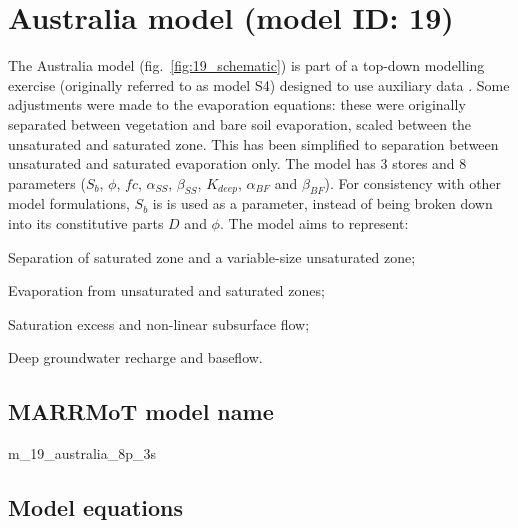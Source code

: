 \section{Australia model (model ID: 19)}
The Australia model (fig.~\ref{fig:19_schematic}) is part of a top-down modelling exercise (originally referred to as model S4) designed to use auxiliary data \citep{Farmer2003}. 
Some adjustments were made to the evaporation equations: these were originally separated between vegetation and bare soil evaporation, scaled between the unsaturated and saturated zone. 
This has been simplified to separation between unsaturated and saturated evaporation only. 
The model has 3 stores and 8 parameters ($S_b$, $\phi$, $fc$, $\alpha_{SS}$, $\beta_{SS}$, $K_{deep}$,  $\alpha_{BF}$ and $\beta_{BF}$). 
For consistency with other model formulations, $S_b$ is is used as a parameter, instead of being broken down into its constitutive parts $D$ and $\phi$. 
The model aims to represent:

\begin{itemizecompact}
\item Separation of saturated zone and a variable-size unsaturated zone;
\item Evaporation from unsaturated and saturated zones;
\item Saturation excess and non-linear subsurface flow;
\item Deep groundwater recharge and baseflow.
\end{itemizecompact}

\subsection{MARRMoT model name}
m\_19\_australia\_8p\_3s \\

\subsection{Model equations}

